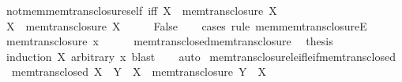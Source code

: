 \begin{isabellebody}
\begin{isamarkuptext}
\end{isamarkuptext}\isamarkuptrue%
\isamarkupfalse%
\ not{\isacharunderscore}{\kern0pt}mem{\isacharunderscore}{\kern0pt}mem{\isacharunderscore}{\kern0pt}trans{\isacharunderscore}{\kern0pt}closure{\isacharunderscore}{\kern0pt}self\ {\isacharbrackleft}{\kern0pt}iff{\isacharbrackright}{\kern0pt}{\isacharcolon}{\kern0pt}\ {\isachardoublequoteopen}X\ {\isasymnotin}\ mem{\isacharunderscore}{\kern0pt}trans{\isacharunderscore}{\kern0pt}closure\ X{\isachardoublequoteclose}\isanewline
%
\isadelimproof
%
\endisadelimproof
%
\isatagproof
{}\isamarkupfalse%
\isanewline
\ \ \isamarkupfalse%
\ {\isachardoublequoteopen}X\ {\isasymin}\ mem{\isacharunderscore}{\kern0pt}trans{\isacharunderscore}{\kern0pt}closure\ X{\isachardoublequoteclose}\isanewline
\ \ \isamarkupfalse%
\ \isamarkupfalse%
\ False\isanewline
\ \ \isamarkupfalse%
\ {\isacharparenleft}{\kern0pt}cases\ rule{\isacharcolon}{\kern0pt}\ mem{\isacharunderscore}{\kern0pt}mem{\isacharunderscore}{\kern0pt}trans{\isacharunderscore}{\kern0pt}closureE{\isacharparenright}{\kern0pt}\isanewline
\ \ \ \ \isamarkupfalse%
\ {\isacharparenleft}{\kern0pt}mem{\isacharunderscore}{\kern0pt}trans{\isacharunderscore}{\kern0pt}closure\ x{\isacharparenright}{\kern0pt}\isanewline
\ \ \ \ \isamarkupfalse%
\ mem{\isacharunderscore}{\kern0pt}trans{\isacharunderscore}{\kern0pt}closed{\isacharunderscore}{\kern0pt}mem{\isacharunderscore}{\kern0pt}trans{\isacharunderscore}{\kern0pt}closure\ \isamarkupfalse%
\ {\isacharquery}{\kern0pt}thesis\ \isamarkupfalse%
\ {\isacharparenleft}{\kern0pt}induction\ X\ arbitrary{\isacharcolon}{\kern0pt}\ x{\isacharparenright}{\kern0pt}\ blast\isanewline
\ \ \isamarkupfalse%
\ auto\isanewline
{}\isamarkupfalse%
%
\endisatagproof
{\isafoldproof}%
%
\isadelimproof
\isanewline
%
\endisadelimproof
\isanewline
{}\isamarkupfalse%
\ mem{\isacharunderscore}{\kern0pt}trans{\isacharunderscore}{\kern0pt}closure{\isacharunderscore}{\kern0pt}le{\isacharunderscore}{\kern0pt}if{\isacharunderscore}{\kern0pt}le{\isacharunderscore}{\kern0pt}if{\isacharunderscore}{\kern0pt}mem{\isacharunderscore}{\kern0pt}trans{\isacharunderscore}{\kern0pt}closed{\isacharcolon}{\kern0pt}\isanewline
\ \ {\isachardoublequoteopen}{\isasymlbrakk}mem{\isacharunderscore}{\kern0pt}trans{\isacharunderscore}{\kern0pt}closed\ X{\isacharsemicolon}{\kern0pt}\ \ Y\ {\isasymle}\ X{\isasymrbrakk}\ {\isasymLongrightarrow}\ mem{\isacharunderscore}{\kern0pt}trans{\isacharunderscore}{\kern0pt}closure\ Y\ {\isasymle}\ X{\isachardoublequoteclose}\isanewline

\end{isabellebody}
